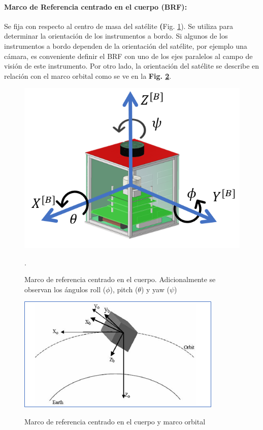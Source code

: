 \paragraph{Marco de Referencia centrado en el cuerpo (BRF):}Se fija con respecto al centro de masa del satélite \textbf({Fig. \ref{fig:marco_cuerpo}}). Se utiliza para determinar la orientación de los instrumentos a bordo. Si algunos de los instrumentos a bordo dependen de la orientación del satélite, por ejemplo una cámara, es conveniente definir el BRF con uno de los ejes paralelos al campo de visión de este instrumento. Por otro lado, la orientación del satélite se describe en relación con el marco orbital como se ve en la \textbf{Fig. \ref{fig:marco_orbital_cuerpo}}.


\begin{figure}[!ht]
	\begin{center}
		\includegraphics[scale=0.7]{imagenes/marco_teorico/marco_cuerpo.PNG}\\
	\end{center}
	\caption{ Marco de referencia centrado en el cuerpo. Adicionalmente se observan los ángulos roll ($\phi$), pitch ($\theta$) y yaw ($\psi$)}.
	\label{fig:marco_cuerpo}
\end{figure}

\begin{figure}[!ht]
	\begin{center}
		\includegraphics[scale=0.9]{imagenes/marco_teorico/orbital_cuerpo.PNG}\\
	\end{center}
	\caption{ Marco de referencia centrado en el cuerpo y marco orbital \cite{Karatas2006}}
	\label{fig:marco_orbital_cuerpo}
\end{figure}

